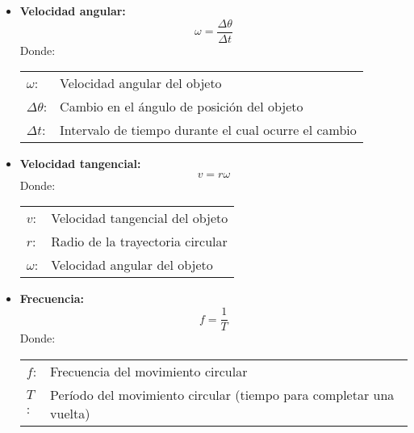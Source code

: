 \begin{itemize}
  \begin{itemize}
    \item \textbf{Velocidad angular:}
  \begin{equation}
  \omega = \frac{\Delta \theta}{\Delta t}
  \end{equation}
  Donde:
  
  \begin{tabular}{@{}ll}
    \(\omega\): & Velocidad angular del objeto \\
    \(\Delta \theta\): & Cambio en el ángulo de posición del objeto \\
    \(\Delta t\): & Intervalo de tiempo durante el cual ocurre el cambio \\
  \end{tabular}

    \item \textbf{Velocidad tangencial:}
  \begin{equation}
  v = r \omega
  \end{equation}
  Donde:

  \begin{tabular}{@{}ll}
    \(v\): & Velocidad tangencial del objeto \\
    \(r\): & Radio de la trayectoria circular \\
    \(\omega\): & Velocidad angular del objeto \\
  \end{tabular}

    \item \textbf{Frecuencia:}
  \begin{equation}
  f = \frac{1}{T}
  \end{equation}
  Donde:

  \begin{tabular}{@{}ll}
    \(f\): & Frecuencia del movimiento circular \\
    \(T\): & Período del movimiento circular (tiempo para completar una vuelta) \\
  \end{tabular}
  
  \end{itemize}
\end{itemize}
